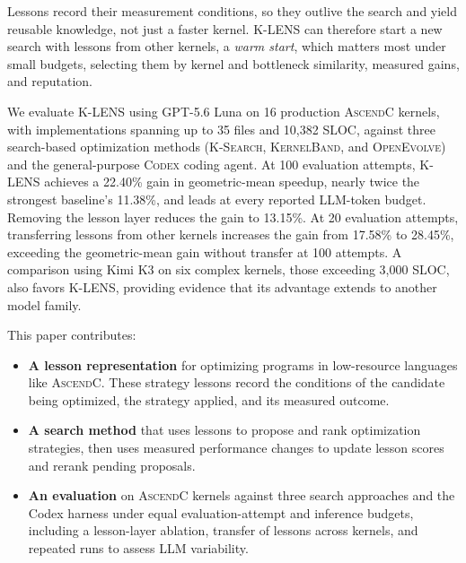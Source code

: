 \documentclass[acmsmall,screen,review,anonymous,nonacm]{acmart}
\newcommand{\klens}{\textsc{K-LENS}\xspace}
\newcommand{\ksearch}{\textsc{K-Search}\xspace}
\newcommand{\kernelband}{\textsc{KernelBand}\xspace}
\newcommand{\openevolve}{\textsc{OpenEvolve}\xspace}
\newcommand{\standardcodex}{\textsc{Codex}\xspace}
\newcommand{\ascendc}{\textsc{AscendC}\xspace}
\begin{document}
Lessons record their measurement conditions, so they outlive the search and
yield reusable knowledge, not just a faster kernel. \klens can therefore start a new search with lessons from other
kernels, a \emph{warm start}, which matters most under small budgets, selecting
them by kernel and bottleneck similarity, measured gains, and reputation.

We evaluate \klens using GPT-5.6 Luna on 16 production \ascendc kernels, with
implementations spanning up to 35 files and 10{,}382 SLOC, against three
search-based optimization methods (\ksearch, \kernelband, and \openevolve) and
the general-purpose \standardcodex coding agent. At 100 evaluation attempts,
\klens achieves a 22.40\% gain in geometric-mean speedup, nearly twice the
strongest baseline's 11.38\%, and leads at every reported LLM-token budget.
Removing the lesson layer reduces the gain to 13.15\%. At 20 evaluation
attempts, transferring lessons from other kernels increases the gain from
17.58\% to 28.45\%, exceeding the geometric-mean gain without transfer at 100
attempts. A comparison using Kimi K3 on six complex kernels, those exceeding
3{,}000 SLOC, also favors \klens, providing evidence that its advantage extends to another model
family.

This paper contributes:
\vspace{-3pt}
\begin{itemize}
  \item \textbf{A lesson representation} for optimizing programs in low-resource
  languages like \ascendc. These strategy lessons record the conditions of the
  candidate being optimized, the strategy applied, and its measured outcome.
  \item \textbf{A search method} that uses lessons to propose and rank optimization
  strategies, then uses measured performance changes to update lesson scores
  and rerank pending proposals.
  \item \textbf{An evaluation} on \ascendc kernels against three search approaches and
  the Codex harness under equal evaluation-attempt and
  inference budgets, including a lesson-layer ablation, transfer of lessons
  across kernels, and repeated runs to assess LLM variability.
\end{itemize}








\end{document}

